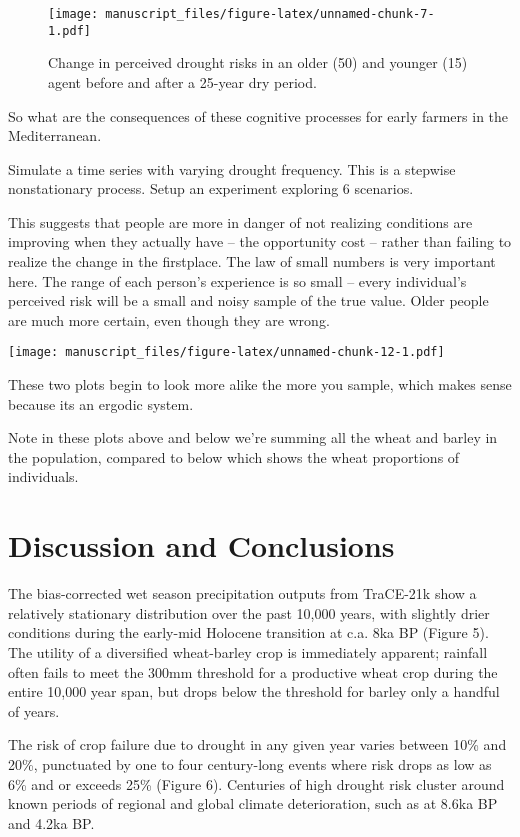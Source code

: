 \documentclass[smallextended]{svjour3}       %
\begin{document}
\begin{figure}
\centering
\texttt{[image: manuscript\_files/figure-latex/unnamed-chunk-7-1.pdf]}
\caption{Change in perceived drought risks in an older (50) and younger
(15) agent before and after a 25-year dry period.}
\end{figure}

So what are the consequences of these cognitive processes for early
farmers in the Mediterranean.

Simulate a time series with varying drought frequency. This is a
stepwise nonstationary process. Setup an experiment exploring 6
scenarios.

This suggests that people are more in danger of not realizing conditions
are improving when they actually have -- the opportunity cost -- rather
than failing to realize the change in the firstplace. The law of small
numbers is very important here. The range of each person's experience is
so small -- every individual's perceived risk will be a small and noisy
sample of the true value. Older people are much more certain, even
though they are wrong.

\texttt{[image: manuscript\_files/figure-latex/unnamed-chunk-12-1.pdf]}

These two plots begin to look more alike the more you sample, which
makes sense because its an ergodic system.

Note in these plots above and below we're summing all the wheat and
barley in the population, compared to below which shows the wheat
proportions of individuals.

\hypertarget{discussion-and-conclusions}{%
\section{Discussion and Conclusions}\label{discussion-and-conclusions}}

The bias-corrected wet season precipitation outputs from TraCE-21k show
a relatively stationary distribution over the past 10,000 years, with
slightly drier conditions during the early-mid Holocene transition at
c.a. 8ka BP (Figure 5). The utility of a diversified wheat-barley crop
is immediately apparent; rainfall often fails to meet the 300mm
threshold for a productive wheat crop during the entire 10,000 year
span, but drops below the threshold for barley only a handful of years.

The risk of crop failure due to drought in any given year varies between
10\% and 20\%, punctuated by one to four century-long events where risk
drops as low as 6\% and or exceeds 25\% (Figure 6). Centuries of high
drought risk cluster around known periods of regional and global climate
deterioration, such as at 8.6ka BP and 4.2ka BP.
\end{document}

